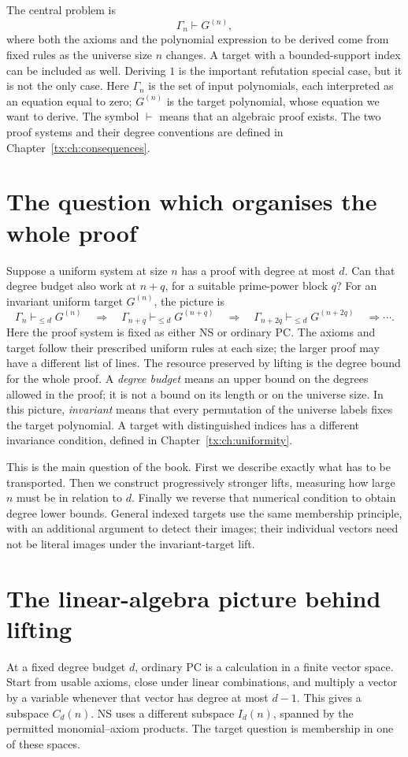 \documentclass[11pt,a4paper,oneside,openany]{book}
\theoremstyle{definition}\newtheorem{definition}[theorem]{Definition}
\theoremstyle{remark}\newtheorem{remark}[theorem]{Remark}
\numberwithin{equation}{chapter}
\begin{document}
The central problem is
\[
                    \Gamma_n\vdash G^{(n)},
\]
where both the axioms and the polynomial expression to be derived come
from fixed rules as the universe size $n$ changes. A target with a
bounded-support index can be included as well. Deriving $1$ is the
important refutation special case, but it is not the only case.
Here $\Gamma_n$ is the set of input polynomials, each interpreted as
an equation equal to zero; $G^{(n)}$ is the target polynomial, whose equation
we want to derive. The symbol $\vdash$ means that an algebraic proof
exists. The two proof systems and their degree conventions are defined
in Chapter~\ref{tx:ch:consequences}.

\section*{The question which organises the whole proof}
Suppose a uniform system at size $n$ has a proof with degree at most
$d$. Can that degree budget also work at $n+q$, for a suitable
prime-power block $q$? For an invariant uniform target $G^{(n)}$, the
picture is
\[
 \Gamma_n\vdash_{\le d}G^{(n)}
 \quad\Longrightarrow\quad
 \Gamma_{n+q}\vdash_{\le d}G^{(n+q)}
 \quad\Longrightarrow\quad
 \Gamma_{n+2q}\vdash_{\le d}G^{(n+2q)}\quad\Longrightarrow\cdots.
\]
Here the proof system is fixed as either NS or ordinary PC. The
axioms and target follow their prescribed uniform rules at each size;
the larger proof may have a different list of lines. The resource
preserved by lifting is the degree bound for the whole proof. A
\emph{degree budget} means an upper bound on the degrees allowed in
the proof; it is not a bound on its length or on the universe size.
In this picture, \emph{invariant} means that every permutation of the
universe labels fixes the target polynomial. A target with distinguished
indices has a different invariance condition, defined in
Chapter~\ref{tx:ch:uniformity}.

This is the main question of the book. First we describe exactly
what has to be transported. Then we construct progressively stronger
lifts, measuring how large $n$ must be in relation to $d$. Finally
we reverse that numerical condition to obtain degree lower bounds.
General indexed targets use the same membership principle, with an
additional argument to detect their images; their individual vectors
need not be literal images under the invariant-target lift.

\section*{The linear-algebra picture behind lifting}
At a fixed degree budget $d$, ordinary PC is a calculation in a finite
vector space. Start from usable axioms, close under linear combinations,
and multiply a vector by a variable whenever that vector has degree at
most $d-1$. This gives a subspace $C_d(n)$. NS uses a different subspace
$I_d(n)$, spanned by the permitted monomial--axiom products. The target
question is membership in one of these spaces.
\end{document}
